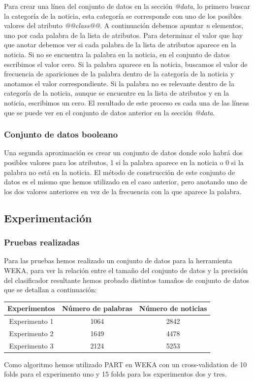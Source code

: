 Para crear una línea del conjunto de datos en la sección \textit{@data}, lo primero buscar la categoría de la noticia, esta categoría se corresponde con uno de los posibles valores del atributo \textit{@@class@@}. A continuación debemos apuntar \textit{n} elementos, uno por cada palabra de la lista de atributos. Para determinar el valor que hay que anotar debemos ver si cada palabra de la lista de atributos aparece en la noticia. Si no se encuentra la palabra en la noticia, en el conjunto de datos escribimos el valor cero. Si la palabra aparece en la noticia, buscamos el valor de frecuencia de apariciones de la palabra dentro de la categoría de la noticia y anotamos el valor correspondiente. Si la palabra no es relevante dentro de la categoría de la noticia, aunque se encuentre en la lista de atributos y en la noticia, escribimos un cero. El resultado de este proceso es cada una de las líneas que se puede ver en el conjunto de datos anterior en la sección \textit{@data}.

\subsubsection{Conjunto de datos booleano}

Una segunda aproximación es crear un conjunto de datos donde solo habrá dos posibles valores para los atributos, 1 si la palabra aparece en la noticia o 0 si la palabra no está en la noticia. El método de construcción de este conjunto de datos es el mismo que hemos utilizado en el caso anterior, pero anotando uno de los dos valores anteriores en vez de la frecuencia con la que aparece la palabra.

\subsection{Experimentación}
\subsubsection{Pruebas realizadas}
Para las pruebas hemos realizado un conjunto de datos para la herramienta WEKA, para ver la relación entre el tamaño del conjunto de datos y la precisión del clasificador resultante hemos probado distintos tamaños de conjunto de datos que se detallan a continuación:
\vspace{1em}
\begin{center}
\begin{tabular}{|c|c|c|}
\hline 
Experimentos & Número de palabras & Número de noticias \\ 
\hline 
Experimento 1 & 1064 & 2842 \\ 
\hline 
Experimento 2 & 1649 & 4478 \\ 
\hline 
Experimento 3 & 2124 & 5253 \\ 
\hline 
\end{tabular} 
\end{center}
\vspace{1em}
Como algoritmo hemos utilizado PART en WEKA con un cross-validation de 10 folds para el experimento uno y 15 folds para los experimentos dos y tres.
